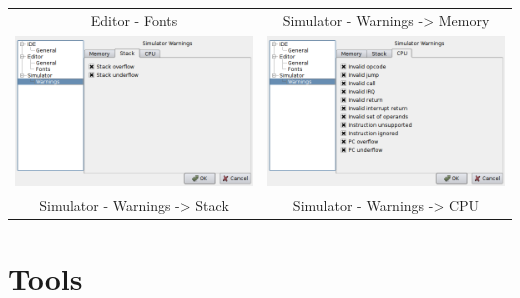 \begin{table}[h!]
\begin{tabular}{cc}
                    \\
                Editor - Fonts & Simulator - Warnings -> Memory
                    \\
                \includegraphics[width=.4\textwidth]{img/interface5.png}
                    &
                \includegraphics[width=.4\textwidth]{img/interface6.png}
                    \\
                Simulator - Warnings -> Stack & Simulator - Warnings -> CPU
            \end{tabular}
        \end{table}

\section{Tools}
